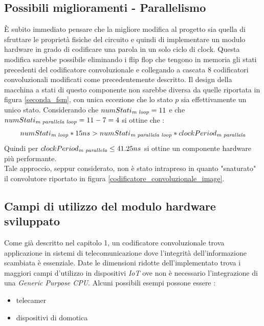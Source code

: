 \documentclass[11pt,a4paper]{article}
\begin{document}
        \subsection{Possibili miglioramenti - Parallelismo}
            È subito immediato pensare che la migliore modifica al progetto sia quella di sfruttare le proprietà fisiche del circuito e quindi di implementare un modulo hardware in grado di codificare una parola in un solo ciclo di clock. 
            Questa modifica sarebbe possibile eliminando i flip flop che tengono in memoria gli stati precedenti del codificatore convoluzionale e collegando a cascata 8 codificatori convoluzionali modificati come precedentemente descritto.
            Il design della macchina a stati di questo componente non sarebbe diversa da quelle riportata in figura \ref{seconda_fsm}, con unica eccezione che lo stato $p$ sia effettivamente un unico stato. 
            Considerando che $numStati_{\textit{\text{m loop}}} =11$ e che $numStati_{\textit{\text{m  parallela loop}}} = 11 -7 = 4$ si ottine che :
            \begin{gather*}
                numStati_{\textit{\text{m loop}}} * 15ns > numStati_{\textit{\text{m  parallela loop}}} * clockPeriod_{\textit{\text{m  parallela}}}
            \end{gather*}
            Quindi per $clockPeriod_{\textit{\text{m  parallela}}} \leq 41.25ns$ si ottine un componente hardware più performante.\\
            Tale approccio, seppur considerato, non è stato intrapreso in quanto "snaturato" il convolutore riportato in figura \ref{codificatore_convoluzionale_image}.
        \subsection{Campi di utilizzo del modulo hardware sviluppato}
            Come già  descritto nel capitolo 1, un codificatore convoluzionale trova applicazione in sistemi di telecomunicazione dove l'integrità dell'informazione scambiata è essenziale.
            Date le dimensioni ridotte dell'implementato trova i maggiori campi d'utilizzo in dispositivi \textit{IoT} ove non è necessario l'integrazione di una \textit{Generic Purpose CPU}.
            Alcuni possibili esempi possone essere :
            \begin{itemize}
                \item telecamer
                \item dispositivi di domotica
            \end{itemize}
\end{document}

